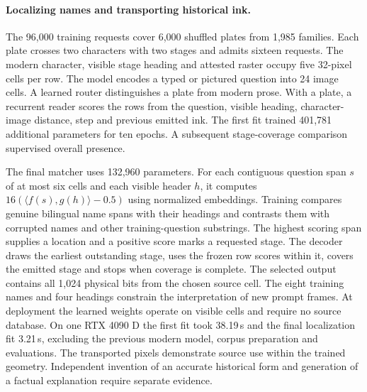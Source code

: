 \paragraph{Localizing names and transporting historical ink.}
The 96,000 training requests cover 6,000 shuffled plates from 1,985 families. Each plate crosses two characters with two stages and admits sixteen requests. The modern character, visible stage heading and attested raster occupy five 32-pixel cells per row. The model encodes a typed or pictured question into 24 image cells. A learned router distinguishes a plate from modern prose. With a plate, a recurrent reader scores the rows from the question, visible heading, character-image distance, step and previous emitted ink. The first fit trained 401,781 additional parameters for ten epochs. A subsequent stage-coverage comparison supervised overall presence.

The final matcher uses 132,960 parameters. For each contiguous question span $s$ of at most six cells and each visible header $h$, it computes $16(\langle f(s),g(h)\rangle-0.5)$ using normalized embeddings. Training compares genuine bilingual name spans with their headings and contrasts them with corrupted names and other training-question substrings. The highest scoring span supplies a location and a positive score marks a requested stage. The decoder draws the earliest outstanding stage, uses the frozen row scores within it, covers the emitted stage and stops when coverage is complete. The selected output contains all 1,024 physical bits from the chosen source cell. The eight training names and four headings constrain the interpretation of new prompt frames. At deployment the learned weights operate on visible cells and require no source database. On one RTX 4090 D the first fit took 38.19\,s and the final localization fit 3.21\,s, excluding the previous modern model, corpus preparation and evaluations. The transported pixels demonstrate source use within the trained geometry. Independent invention of an accurate historical form and generation of a factual explanation require separate evidence.

